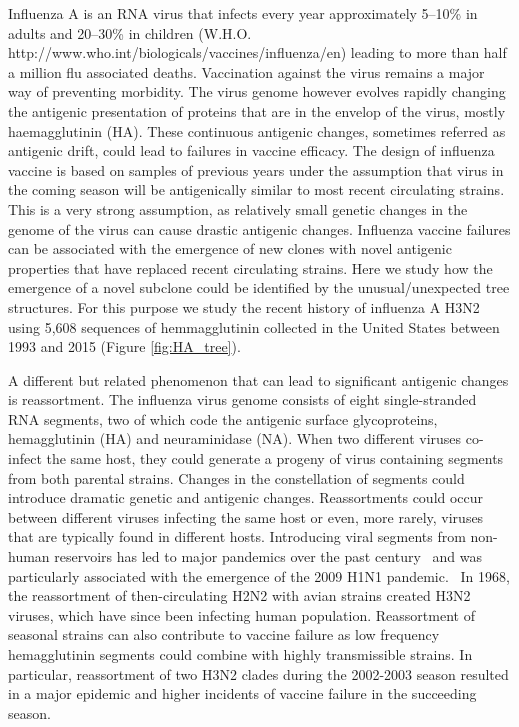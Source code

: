 \documentclass[a4paper,11pt]{article}
\begin{document}
Influenza A is an RNA virus that infects every year approximately 5--10\% in adults and 20--30\% in children (W.H.O. http://www.who.int/biologicals/vaccines/influenza/en) leading to more than half a million flu associated deaths.
Vaccination against the virus remains a major way of preventing morbidity.
The virus genome however evolves rapidly changing the antigenic presentation of proteins that are in the envelop of the virus, mostly haemagglutinin (HA).
These continuous antigenic changes, sometimes referred as antigenic drift, could lead to failures in vaccine efficacy.
The design of influenza vaccine is based on samples of previous years under the assumption that virus in the coming season will be antigenically similar to most recent circulating strains.
This is a very strong assumption, as relatively small genetic changes in the genome of the virus can cause drastic antigenic changes.
Influenza vaccine failures can be associated with the emergence of new clones with novel antigenic properties that have replaced recent circulating strains.
Here we study how the emergence of a novel subclone could be identified by the unusual/unexpected tree structures.
For this purpose we study the recent history of influenza A H3N2 using 5,608 sequences of hemmagglutinin collected in the United States between 1993 and 2015 (Figure \ref{fig:HA_tree}).

A different but related phenomenon that can lead to significant antigenic changes is reassortment.
The influenza virus genome consists of eight single-stranded RNA segments, two of which code the antigenic surface glycoproteins, hemagglutinin (HA) and neuraminidase (NA).
When two different viruses co-infect the same host, they could generate a progeny of virus containing segments from both parental strains.
Changes in the constellation of segments could introduce dramatic genetic and antigenic changes.
Reassortments could occur between different viruses infecting the same host or even, more rarely, viruses that are typically found in different hosts.
Introducing viral segments from non-human reservoirs has led to major pandemics over the past century~\cite{rabadan2007evolution, rabadan2008non} and was particularly associated with the emergence of the 2009 H1N1 pandemic.~\cite{trifonov2009geographic, solovyov2009cluster}
In 1968, the reassortment of then-circulating H2N2 with avian strains created H3N2 viruses, which have since been infecting human population.
Reassortment of seasonal strains can also contribute to vaccine failure as low frequency hemagglutinin segments could combine with highly transmissible strains.
In particular, reassortment of two H3N2 clades during the 2002-2003 season resulted in a major epidemic and higher incidents of vaccine failure in the succeeding season.~\cite{centers2004preliminary}
\end{document}
